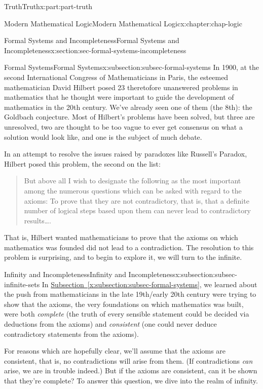 \documentclass[oneside,10pt,]{book}
\newcommand{\xreffont}{\relax}
\numberwithin{equation}{section}
\begin{document}
\begin{partptx}{Truth}{}{Truth}{}{}{x:part:part-truth}
\begin{chapterptx}{Modern Mathematical Logic}{}{Modern Mathematical Logic}{}{}{x:chapter:chap-logic}
\begin{sectionptx}{Formal Systems and Incompleteness}{}{Formal Systems and Incompleteness}{}{}{x:section:sec-formal-systems-incompleteness}
\begin{subsectionptx}{Formal Systems}{}{Formal Systems}{}{}{x:subsection:subsec-formal-systems}
In 1900, at the second International Congress of Mathematicians in Paris, the esteemed mathematician David Hilbert posed 23 theretofore unanswered problems in mathematics that he thought were important to guide the development of mathematics in the 20th century. We've already seen one of them (the 8th): the Goldbach conjecture. Most of Hilbert's problems have been solved, but three are unresolved, two are thought to be too vague to ever get consensus on what a solution would look like, and one is the subject of much debate.%
\par
In an attempt to resolve the issues raised by paradoxes like Russell's Paradox, Hilbert posed this problem, the second on the list:%
\begin{quote}%
But above all I wish to designate the following as the most important among the numerous questions which can be asked with regard to the axioms: To prove that they are not contradictory, that is, that a definite number of logical steps based upon them can never lead to contradictory results….\end{quote}
That is, Hilbert wanted mathematicians to prove that the axioms on which mathematics was founded did not lead to a contradiction. The resolution to this problem is surprising, and to begin to explore it, we will turn to the infinite.%
\end{subsectionptx}
%
%
\typeout{************************************************}
\typeout{************************************************}
%
\begin{subsectionptx}{Infinity and Incompleteness}{}{Infinity and Incompleteness}{}{}{x:subsection:subsec-infinite-sets}
In \hyperref[x:subsection:subsec-formal-systems]{Subsection~{\xreffont\ref{x:subsection:subsec-formal-systems}}}, we learned about the push from mathematicians in the late 19th\slash{}early 20th century were trying to show that the axioms, the very foundations on which mathematics was built, were both \emph{complete} (the truth of every sensible statement could be decided via deductions from the axioms) and \emph{consistent} (one could never deduce contradictory statements from the axioms).%
\par
For reasons which are hopefully clear, we'll assume that the axioms are consistent, that is, no contradictions will arise from them. (If contradictions \emph{can} arise, we are in trouble indeed.) But if the axioms are consistent, can it be shown that they're complete? To answer this question, we dive into the realm of infinity.%

\end{subsectionptx}
\end{sectionptx}
\end{chapterptx}
\end{partptx}
\end{document}
